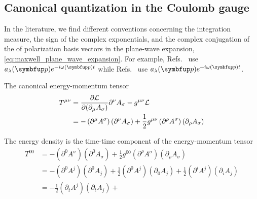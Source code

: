 \subsection{Canonical quantization in the Coulomb gauge}

In the literature, we find different conventions concerning the integration measure, the sign of the complex exponentials, and the complex conjugation of the of polarization basis vectors in the plane-wave expansion, \cref{eq:maxwell_plane_wave_expansion}.
For example, Refs.~\cite{Peskin1995,Greiner2013} use $a_\lambda(\vb{p})e^{-i\omega(\vb{p})t}$ while Refs.~\cite{Srednicki2007,Weinberg1995} use $a_\lambda(\vb{p})e^{+i\omega(\vb{p})t}$.

The canonical energy-momentum tensor~\cite[p.~174]{Greiner2013}
\begin{equation}
	\begin{split}
		T^{\mu\nu}
		&=
		\pdv{\mathcal{L}}{(\partial_\mu A_\sigma)}
		\partial^\nu A_\sigma
		-
		g^{\mu\nu}\mathcal{L}
		\\
		&=
		-
		\left(
			\partial^\mu
			A^\sigma
		\right)
		\left(
			\partial^\nu
			A_\sigma
		\right)
		+
		\frac{1}{2}
		g^{\mu\nu}
		\left(
			\partial^\rho
			A^\sigma
		\right)
		\left(
			\partial_\rho
			A_\sigma
		\right)
	\end{split}
\end{equation}

The energy density is the time-time component of the energy-momentum tensor
\begin{equation}
	\begin{split}
		T^{00}
		&=
		-
		\left(
			\partial^0
			A^\sigma
		\right)
		\left(
			\partial^0
			A_\sigma
		\right)
		+
		\frac{1}{2}
		g^{00}
		\left(
			\partial^\rho
			A^\sigma
		\right)
		\left(
			\partial_\rho
			A_\sigma
		\right)
		\\
		&=
		-
		\left(
			\partial^0
			A^j
		\right)
		\left(
			\partial^0
			A_j
		\right)
		+
		\frac{1}{2}
		\left(
			\partial^0
			A^j
		\right)
		\left(
			\partial_0
			A_j
		\right)
		+
		\frac{1}{2}
		\left(
			\partial^i
			A^j
		\right)
		\left(
			\partial_i
			A_j
		\right)
		\\
		&=
		-
		\frac{1}{2}
		\left(
			\partial_t
			A^j
		\right)
		\left(
			\partial_t
			A_j
		\right)
		+
	\end{split}
\end{equation}

